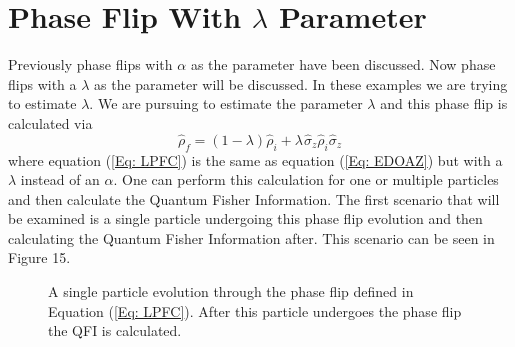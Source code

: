 \documentclass[twocolumn]{article}
\begin{document}
\section*{Phase Flip With $\lambda$ Parameter}
Previously phase flips with $\alpha$ as the parameter have been discussed. Now phase flips with a $\lambda$ as the parameter will be discussed. In these examples we are trying to estimate $
\lambda$. We are pursuing to estimate the parameter $\lambda$ and this phase flip is calculated via
\begin{equation}\label{Eq: LPFC}
\hat{\rho}_f=(1-\lambda)\hat{\rho}_i+\lambda\hspace{1pt}\hat{\sigma}_z\hat{\rho}_i\hat{\sigma}_z
\end{equation}
where equation (\ref{Eq: LPFC}) is the same as equation (\ref{Eq: EDOAZ}) but with a $\lambda$ instead of an $\alpha$. One can perform this calculation for one or multiple particles and then calculate the Quantum Fisher Information. The first scenario that will be examined is a single particle undergoing this phase flip evolution and then calculating the Quantum Fisher Information after. This scenario can be seen in Figure 15.
\begin{figure}[ht]
    \centering
    \caption{\footnotesize{A single particle evolution through the phase flip defined in Equation (\ref{Eq: LPFC}). After this particle undergoes the phase flip the QFI is calculated.}}
    \label{Fig: SPPFE}
\end{figure}
\end{document}
